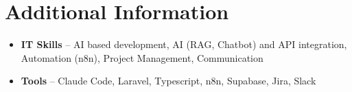 \documentclass[a4paper,10pt]{article}
\begin{document}
\section{Additional Information}
\begin{itemize}
\item \textbf{IT Skills} -- AI based development, AI (RAG, Chatbot) and API integration, Automation (n8n), Project Management, Communication
\item \textbf{Tools} -- Claude Code, Laravel, Typescript, n8n, Supabase, Jira, Slack
\end{itemize}
\end{document}
